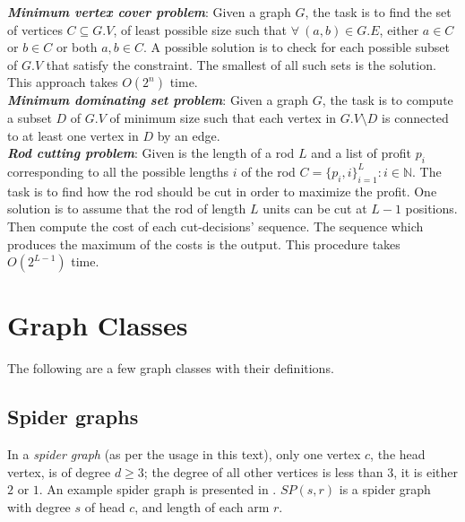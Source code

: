 \textbf{\textit{Minimum vertex cover problem}}: Given a graph $G$, the task is to find the set of vertices $C\subseteq G.V$, of least possible size such that $\forall\ (a,b) \in G.E$, either $a \in C$ or $b\in C$ or both $a,b \in C$. A possible solution is to check for each possible subset of $G.V$ that satisfy the constraint. The smallest of all such sets is the solution. This approach takes $O(2^n)$ time.\\

\textbf{\textit{Minimum dominating set problem}}: Given a graph $G$, the task is to compute a subset $D$ of $G.V$ of minimum size such that each vertex in $G.V\setminus D$ is connected to at least one vertex in $D$ by an edge.\\

\textbf{\textit{Rod cutting problem}}: Given is the length of a rod $L$ and a list of profit $p_i$ corresponding to all the possible lengths $i$ of the rod $C = \{p_i, i\}_{i=1}^L: i\in\mathbb{N}$. The task is to find how the rod should be cut in order to maximize the profit. One solution is to assume that the rod of length $L$ units can be cut at $L-1$ positions. Then compute the cost of each cut-decisions' sequence. The sequence which produces the maximum of the costs is the output. This procedure takes $O(2^{L-1})$ time.

\section{Graph Classes}

The following are a few graph classes with their definitions.

\subsection{Spider graphs}

In a \textit{spider graph} (as per the usage in this text), only one vertex $c$, the head vertex, is of degree $d \geq 3$; the degree of all other vertices is less than $3$, it is either $2$ or $1$. An example spider graph is presented in . {\boldmath$SP(s,r)$}  is a spider graph with degree $s$ of head $c$, and length of each arm $r$.

